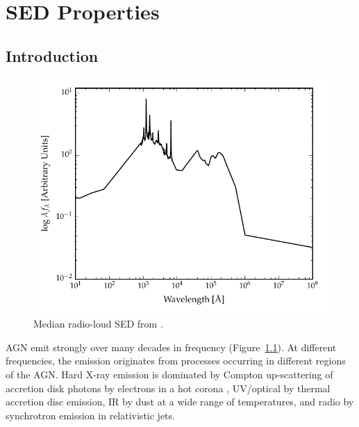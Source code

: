 
\chapter{SED Properties}
\label{ch:sed} 



\section{Introduction}

\begin{figure}
  \centering
  \includegraphics[width=\textwidth]{figures/chapter05/shangsed.pdf}
  \caption{Median radio-loud SED from \citet{shang11}.}
  \label{fig:seyfert_sed}
\end{figure}

AGN emit strongly over many decades in frequency (Figure~\ref{fig:seyfert_sed}). 
At different frequencies, the emission originates from processes occurring in different regions of the \ac{AGN}. 
Hard X-ray emission is dominated by Compton up-scattering of accretion disk photons by electrons in a hot corona \citep[e.g.][]{sunyaev80}, \ac{UV}/optical by thermal accretion disc emission, \ac{IR} by dust at a wide range of temperatures, and radio by synchrotron emission in relativistic jets.   


